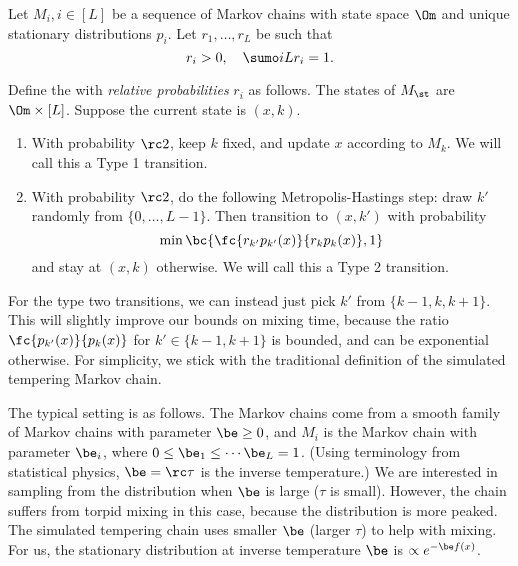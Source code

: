 \begin{df}
Let $M_i, i\in [L]$ be a sequence of Markov chains with state space $\Om$ and unique stationary distributions $p_i$. 
Let $r_1,\ldots, r_{L}$ be such that 
$$
r_i> 0,\quad \sumo i{L} r_i = 1.
$$

Define the  with \emph{relative probabilities} $r_i$ as follows. 
The states of $M_{\st}$ are $\Om\times [L]$. 
Suppose the current state is $(x, k)$. 
\begin{enumerate}
\item
With probability $\rc2$, keep $k$ fixed, and update $x$ according to $M_{k}$. We will call this a Type 1 transition. 
\item
With probability $\rc2$, do the following Metropolis-Hastings step: draw $k'$ randomly from $\{0,\ldots, L-1\}$. Then transition to $(x,k')$ with probability
$$
\min \bc{\fc{r_{k'}p_{k'}(x)}{r_kp_k(x)}, 1}
$$
and stay at $(x,k)$ otherwise. We will call this a Type 2 transition. 
\end{enumerate}
\label{df:temperingchain}
\end{df}

\begin{rem}
For the type two transitions, we can instead just pick $k'$ from $\{k-1,k,k+1\}$. This will slightly improve our bounds on mixing time, because the ratio $\fc{p_{k'}(x)}{p_k(x)}$ for $k'\in \{k-1,k+1\}$ is bounded, and can be exponential otherwise. For simplicity, we stick with the traditional definition of the simulated tempering Markov chain.
\end{rem}

The typical setting is as follows. The Markov chains come from a smooth family of Markov chains with parameter $\be\ge 0$, and $M_i$ is the Markov chain with parameter $\be_i$, where $0\le \be_1\le \cdots \be_{L}=1$. (Using terminology from statistical physics, $\be=\rc\tau$ is the inverse temperature.) 
We are interested in sampling from the distribution when $\be$ is large ($\tau$ is small). However, the chain suffers from torpid mixing in this case, because the distribution is more peaked. The simulated tempering chain uses smaller $\be$ (larger $\tau$) to help with mixing.
For us, the stationary distribution at inverse temperature $\be$ is $\propto e^{-\be f(x)}$. 

